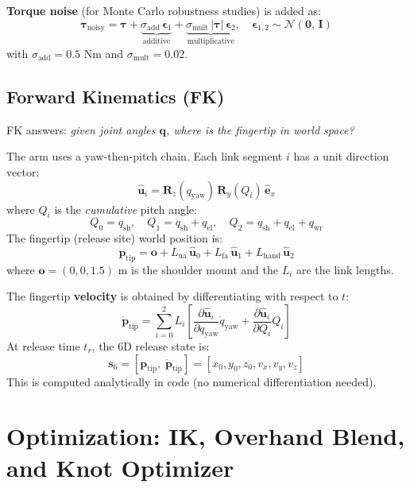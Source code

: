 \documentclass[11pt,letterpaper]{article}
\newcommand{\bq}{\bm{q}}
\newcommand{\btau}{\bm{\tau}}
\begin{document}
\textbf{Torque noise} (for Monte Carlo robustness studies) is added as:
\begin{equation}
  \btau_{\text{noisy}} = \btau + \underbrace{\sigma_{\text{add}}\,\bm{\epsilon}_1}_{\text{additive}} + \underbrace{\sigma_{\text{mult}}\,|\btau|\,\bm{\epsilon}_2}_{\text{multiplicative}},
  \quad \bm{\epsilon}_{1,2} \sim \mathcal{N}(\bm{0},\, \mathbf{I})
\end{equation}
with $\sigma_{\text{add}} = 0.5$ Nm and $\sigma_{\text{mult}} = 0.02$.

\subsection{Forward Kinematics (FK)}

FK answers: \emph{given joint angles $\bq$, where is the fingertip in world space?}

The arm uses a yaw-then-pitch chain. Each link segment $i$ has a unit direction vector:
\begin{equation}
  \hat{\bm{u}}_i = \mathbf{R}_z(q_{\text{yaw}})\, \mathbf{R}_y(Q_i)\, \hat{\bm{e}}_x
\end{equation}
where $Q_i$ is the \emph{cumulative} pitch angle:
\[
  Q_0 = q_{\text{sh}}, \quad Q_1 = q_{\text{sh}} + q_{\text{el}}, \quad Q_2 = q_{\text{sh}} + q_{\text{el}} + q_{\text{wr}}
\]
The fingertip (release site) world position is:
\begin{equation}
  \bm{p}_{\text{tip}} = \bm{o} + L_{\text{ua}}\,\hat{\bm{u}}_0 + L_{\text{fa}}\,\hat{\bm{u}}_1 + L_{\text{hand}}\,\hat{\bm{u}}_2
\end{equation}
where $\bm{o} = (0,0,1.5)$ m is the shoulder mount and the $L_i$ are the link lengths.

The fingertip \textbf{velocity} is obtained by differentiating with respect to $t$:
\begin{equation}
  \dot{\bm{p}}_{\text{tip}} = \sum_{i=0}^{2} L_i \left[
    \frac{\partial \hat{\bm{u}}_i}{\partial q_{\text{yaw}}}\dot{q}_{\text{yaw}} +
    \frac{\partial \hat{\bm{u}}_i}{\partial Q_i}\dot{Q}_i
  \right]
\end{equation}
At release time $t_r$, the 6D release state is:
\[
  \bm{s}_6 = [\bm{p}_{\text{tip}},\; \dot{\bm{p}}_{\text{tip}}] = [x_0, y_0, z_0, v_x, v_y, v_z]
\]
This is computed analytically in code (no numerical differentiation needed).

\section{Optimization: IK, Overhand Blend, and Knot Optimizer}
\end{document}
